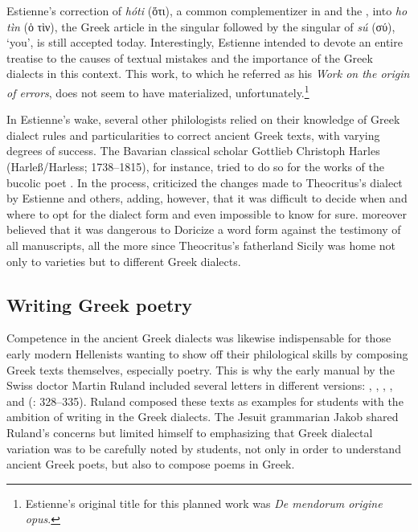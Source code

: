 Estienne’s correction of \textit{hóti} (ὅτι), a common complementizer in  and the , into \textit{ho tìn} (ὁ τὶν), the Greek article in the  singular followed by the   singular of \textit{sú} (σύ), ‘you’, is still accepted today. Interestingly, Estienne intended to devote an entire treatise to the causes of textual mistakes and the importance of the Greek dialects in this context. This work, to which he referred as his \textit{Work on the origin of errors}, does not seem to have materialized, unfortunately.\footnote{Estienne’s original  title for this planned work was \textit{De mendorum origine opus}.}

In Estienne’s wake, several other philologists relied on their knowledge of Greek dialect rules and particularities to correct ancient Greek texts, with varying degrees of success. The Bavarian classical scholar Gottlieb Christoph Harles (Harleß/Harless; 1738–1815), for instance, tried to do so for the works of the bucolic poet . In the process, \citet[\textsc{xxii–xxiv}]{Harles1780} criticized the changes made to Theocritus’s  dialect by Estienne and others, adding, however, that it was difficult to decide when and where to opt for the dialect form and even impossible to know for sure. \citet[\textsc{xxxi–xxxii}]{Harles1780} moreover believed that it was dangerous to Doricize a word form against the testimony of all manuscripts, all the more since Theocritus’s fatherland Sicily was home not only to  varieties but to different Greek dialects.

\subsection{Writing Greek poetry}

Competence in the ancient Greek dialects was likewise indispensable for those early modern Hellenists wanting to show off their philological skills by composing Greek texts themselves, especially poetry. This is why the early manual by the Swiss doctor Martin Ruland included several letters in different versions: , , , , and  (\citealt{Ruland1556}: 328–335). Ruland composed these texts as examples for students with the ambition of writing in the Greek dialects. The Jesuit grammarian Jakob \citet[35]{Gretser1593} shared Ruland’s concerns but limited himself to emphasizing that Greek dialectal variation was to be carefully noted by students, not only in order to understand ancient Greek poets, but also to compose poems in Greek.

